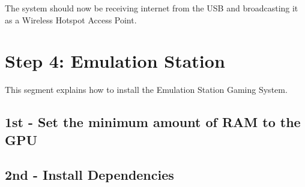 \documentclass[letterpaper,10pt,openany,oneside,english]{sphinxmanual}
\begin{document}
The system should now be receiving internet from the USB and broadcasting it as a Wireless Hotspot Access Point.


\section{Step 4: Emulation Station}
\label{\detokenize{manual_build:step-4-emulation-station}}
This segment explains how to install the Emulation Station Gaming System.


\subsection{1st - Set the minimum amount of RAM to the GPU}
\label{\detokenize{manual_build:st-set-the-minimum-amount-of-ram-to-the-gpu}}\begin{quote}



\end{quote}


\subsection{2nd - Install Dependencies}
\label{\detokenize{manual_build:nd-install-dependencies}}\begin{quote}

\end{quote}
\end{document}
